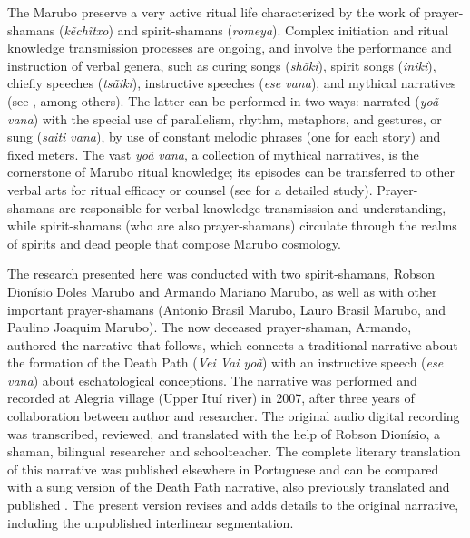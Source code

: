 \documentclass[output=paper,
modfonts,nonflat
]{langsci/langscibook}
\begin{document}
The Marubo preserve a very active ritual life characterized by the work of prayer-shamans (\textit{kẽchĩtxo}) and spirit-shamans (\textit{romeya}). Complex initiation and ritual knowledge transmission processes are ongoing, and involve the performance and instruction of verbal genera, such as curing songs (\textit{shõki}), spirit songs (\textit{iniki}), chiefly speeches (\textit{tsãiki}), instructive speeches (\textit{ese vana}), and mythical narratives (see \citealt{Montagner1985,Montagner1996,Cesarino2011,Cesarino2013}, among others). The latter can be performed in two ways: narrated (\textit{yoã vana}) with the special use of parallelism, rhythm, metaphors, and gestures, or sung (\textit{saiti vana}), by use of constant melodic phrases (one for each story) and fixed meters. The vast \textit{yoã vana}, a collection of mythical narratives, is the cornerstone of Marubo ritual knowledge; its episodes can be transferred to other verbal arts for ritual efficacy or counsel (see \citealt{Cesarino2011} for a detailed study). Prayer-shamans are responsible for verbal knowledge transmission and understanding, while spirit-shamans (who are also prayer-shamans) circulate through the realms of spirits and dead people that compose Marubo cosmology.

The research presented here was conducted with two spirit-shamans, Robson Dionísio Doles Marubo and Armando Mariano Marubo, as well as with other important prayer-shamans (Antonio Brasil Marubo, Lauro Brasil Marubo, and Paulino Joaquim Marubo). The now deceased prayer-shaman, Armando, authored the narrative that follows, which connects a traditional narrative about the formation of the Death Path (\textit{Vei Vai yoã}) with an instructive speech (\textit{ese vana}) about eschatological conceptions. The narrative was performed and recorded at Alegria village (Upper Ituí river) in 2007, after three years of collaboration between author and researcher. The original audio digital recording was transcribed, reviewed, and translated with the help of Robson Dionísio, a shaman, bilingual researcher and schoolteacher. The complete literary translation of this narrative was published elsewhere in Portuguese \citep{Cesarino2012} and can be compared with a sung version of the Death Path narrative, also previously translated and published \citep[303ff]{Cesarino2011}. The present version revises and adds details to the original narrative, including the unpublished interlinear segmentation.
\end{document}
